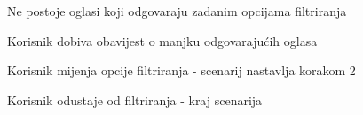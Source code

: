 \begin{packed_item}
\begin{packed_item}
							\item[2.b] Ne postoje oglasi koji odgovaraju zadanim opcijama filtriranja
							\item[] \begin{packed_enum}							
								\item Korisnik dobiva obavijest o manjku odgovarajućih oglasa
								\item
									\begin{packed_enum}
										\item Korisnik mijenja opcije filtriranja - scenarij nastavlja korakom 2
										\item Korisnik odustaje od filtriranja - kraj scenarija
									\end{packed_enum}							
							\end{packed_enum}	
						\end{packed_item}
					\end{packed_item}

